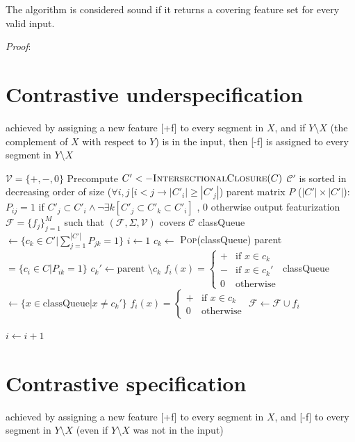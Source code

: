 \documentclass[11pt, oneside]{article}   	%
\begin{document}
\vspace{\baselineskip} The algorithm is considered sound if it returns a covering feature set for every valid input. 

\textit{Proof}:




\section{Contrastive underspecification}
achieved by assigning a new feature [+f] to every segment in $X$, and if $Y \setminus X$ (the complement of $X$ with respect to $Y$) is in the input, then [-f] is assigned to every segment in $Y \setminus X$


\vspace{\baselineskip} \noindent \begin{algorithmic}
	\REQUIRE $\mathcal V = \{ +, -, 0 \}$
	\REQUIRE Precompute $C' <- \textsc{IntersectionalClosure}(C)$
	\REQUIRE $\mathcal C'$ is sorted in decreasing order of size ($\forall i, j \, [i < j \rightarrow |C'_i| \geq |C'_j|$)
	\REQUIRE parent matrix $P$ ($|C'| \times |C'|$): $P_{ij} = 1$ if $C'_j \subset C'_i \land \neg \exists k [C'_j \subset C'_k \subset C'_i]$ , $0$ otherwise
	\ENSURE output featurization $\mathcal F = \{ f_j \}_{j=1}^M$ such that $(\mathcal F, \Sigma, \mathcal V)$ covers $\mathcal C$
	\STATE classQueue $\leftarrow \{c_k \in C' | \sum_{j=1}^{|C'|}P_{jk} = 1 \}$
	\STATE $i \leftarrow 1$
	\STATE
	\STATE $c_k \leftarrow$ \textsc{Pop}(classQueue)
	\STATE parent $ = \{c_i \in C | P_{ik} = 1\}$
	\STATE $c_k' \leftarrow \mbox{parent } \setminus c_k$
	\STATE $f_i(x) = \begin{cases}
	+ & \mbox{if } x \in c_k \\
	- & \mbox{if } x \in c_k' \\
	0 & \mbox{otherwise}
	\end{cases} $
	\STATE classQueue $\leftarrow \{x \in \mbox{classQueue} | x \not= c_k' \}$
	\ELSE
	\STATE $f_i(x) = \begin{cases}
	+ & \mbox{if } x \in c_k \\
	0 & \mbox{otherwise}
	\end{cases} $
	\ENDIF
	\STATE $\mathcal F \leftarrow \mathcal F \cup f_i$
	
	\STATE $i \leftarrow i + 1$
	\ENDWHILE
\end{algorithmic}

\section{Contrastive specification}
achieved by assigning a new feature [+f] to every segment in $X$, and [-f] to every segment in $Y \setminus X$ (even if $Y \setminus X$ was not in the input)
\end{document}
